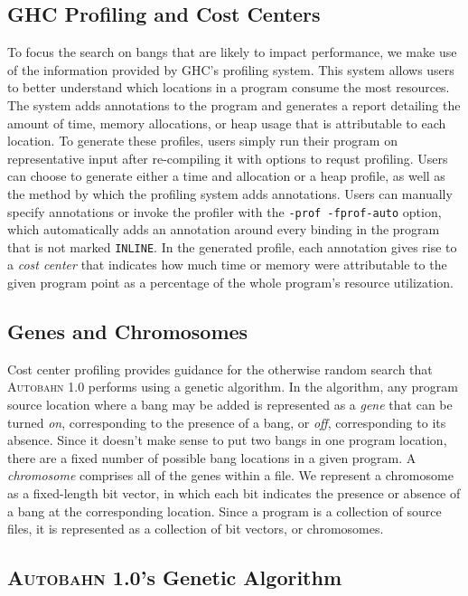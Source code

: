\documentclass[format=sigplan, review=true]{acmart}
\newcommand{\Ao}[0]{\textsc{Autobahn 1.0}}
\begin{document}
\subsection{GHC Profiling and Cost Centers}
To focus the search on bangs that are likely to impact performance, we
make use of the information provided by GHC's profiling system.
This system allows users to better understand which locations
in a program consume the most resources.  The system adds annotations
to the program and generates a report detailing the amount of time,
memory allocations, or heap usage that is attributable to each location.
To generate these profiles, users simply run their program on
representative input after re-compiling it with options to requst profiling.
Users can choose to generate either a time and allocation or a heap
profile, as well as the method by which the profiling system adds
annotations. Users can manually specify
annotations or invoke the profiler with  the \texttt{-prof -fprof-auto} option, which
automatically adds an annotation around every binding in the program
that is not marked \texttt{INLINE}.  In the generated profile, each
annotation gives rise to a \textit{cost center} that indicates how
much time or memory were attributable to the given program point as a
percentage of the whole program's resource utilization.  


\subsection{Genes and Chromosomes}

Cost center profiling provides guidance for the otherwise random
search that \Ao{} performs using a genetic algorithm. In the
algorithm, any program source location where a bang may be added is
represented as a \textit{gene} that can be turned \textit{on},
corresponding to the presence of a bang, or \textit{off},
corresponding to its absence.  Since it doesn't make sense to put two
bangs in one program location, there are a fixed number of possible
bang locations in a given program. A \textit{chromosome} comprises all
of the genes within a file. We represent a chromosome as a
fixed-length bit vector, in which each bit indicates the presence or
absence of a bang at the corresponding location. Since a program is a
collection of source files, it is represented as a collection of bit
vectors, or chromosomes.

\subsection{\Ao{}'s Genetic Algorithm}
\end{document}
